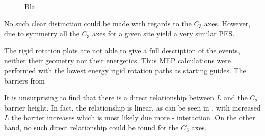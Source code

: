 \begin{figure}[h]
\begin{center}
    \parbox{0.85\linewidth}{
      \caption{Bla
      }
      \label{fig:h-mg-distances}
    }
\end{center}
\end{figure}



No such clear distinction could be made with regards to the $C_3$ axes.
However, due to symmetry all the $C_3$ axes for a given site yield a very similar PES. 

The rigid rotation plots are not able to give a full description of the events, neither their geometry nor their energetics.
Thus MEP calculations were performed with the lowest energy rigid rotation paths as starting guides.
The barriers from 


It is unsurprising to find that there is a direct relationship between $L$ and the $C_2$ barrier height.
In fact, the relationship is linear, as can be seen in , with increased $L$ the barrier increases which is most likely due more - interaction.
On the other hand, no such direct relationship could be found for the $C_3$ axes.

\incomplete
